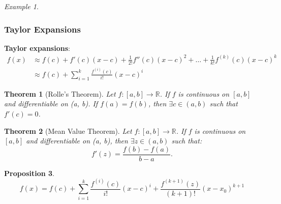 \documentclass{amsart}
\newtheorem{theorem}{Theorem}[section]
\newtheorem{proposition}[theorem]{Proposition}
\theoremstyle{definition}
\theoremstyle{remark}
\newtheorem*{example*}{Example}
\numberwithin{equation}{section}
\begin{document}
\begin{example*}
\end{example*}

\subsubsection{Taylor Expansions}

\textbf{Taylor expansions}:
\begin{align*}
    f(x) & \approx f(c) + f'(c)(x-c) + \frac{1}{2!}f''(c)(x-c)^{2} + \dots + \frac{1}{k!}f ^{(k)}(c)(x-c)^{k} \\
         & \approx f(c) + \sum_{i=1}^{k}\frac{f ^{(i)}(c)}{i!}(x-c)^{i}
\end{align*}

\begin{theorem}[Rolle's Theorem]
    Let $f: [a, b] \to \mathbb{R}$. If $f$ is continuous on $[a, b]$ and differentiable on (a, b). If $f(a)=f(b)$, then $\exists c \in (a,b)$ such that $f'(c) = 0$.
\end{theorem}

\begin{theorem}[Mean Value Theorem]
    Let $f: [a, b] \to \mathbb{R}$. If $f$ is continuous on $[a, b]$ and differentiable on (a, b), then $\exists z \in (a,b)$ such that:
    \begin{equation*}
        f'(z) = \frac{f(b)- f(a)}{b-a}.
    \end{equation*}
\end{theorem}

\begin{proposition}
    \begin{equation*}
        f(x) = f(c) + \sum_{i=1}^{k}\frac{f ^{(i)}(c)}{i!}(x-c)^{i} + \frac{f ^{(k+1)}(z)}{(k+1)!}(x-x_0)^{k+1}
    \end{equation*}
\end{proposition}
\end{document}

